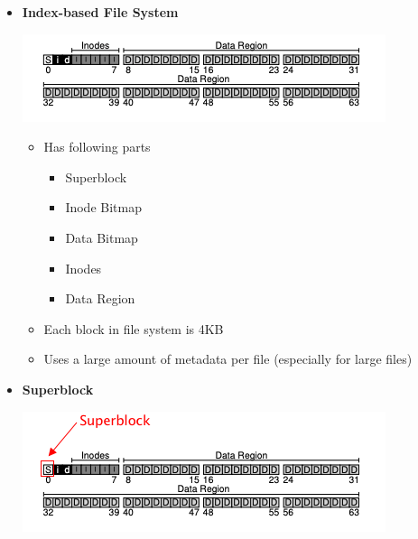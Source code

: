 \documentclass[12pt]{article}
\begin{document}
\begin{itemize}

    \item \textbf{Index-based File System}

    \begin{center}

    \includegraphics[width=\linewidth]{images/midterm_1_solution_8.png}
    \end{center}

    \begin{itemize}
        \item Has following parts

        \begin{itemize}
            \item Superblock
            \item Inode Bitmap
            \item Data Bitmap
            \item Inodes
            \item Data Region
        \end{itemize}

        \item Each block in file system is 4KB
        \item Uses a large amount of metadata per file (especially for large files)
    \end{itemize}

    \item \textbf{Superblock}

    \begin{center}
    \includegraphics[width=\linewidth]{images/midterm_1_solution_9.png}
    \end{center}


\end{itemize}
\end{document}
